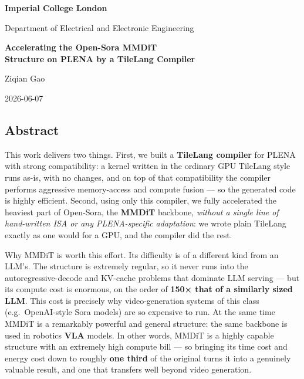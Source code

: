 \documentclass[
  10pt,
]{article}
\author{}
\date{}
\begin{document}
\begin{titlepage}
\centering
\vspace*{2cm}

{\LARGE\bfseries Imperial College London\par}
\vspace{0.5cm}
{\large Department of Electrical and Electronic Engineering\par}

\vspace{3cm}

{\Huge\bfseries Accelerating the Open-Sora MMDiT\\[4mm]
Structure on PLENA by a TileLang Compiler\par}

\vspace{2.5cm}

{\Large Ziqian Gao\par}

\vfill

{\large 2026-06-07\par}
\vspace{1cm}
\end{titlepage}

{
\setcounter{tocdepth}{3}
\tableofcontents
}

\subsection*{Abstract}\label{abstract}

This work delivers two things. First, we built a \textbf{TileLang
compiler} for PLENA with strong compatibility: a kernel written in the
ordinary GPU TileLang style runs as-is, with no changes, and on top of
that compatibility the compiler performs aggressive memory-access and
compute fusion --- so the generated code is highly efficient. Second,
using only this compiler, we fully accelerated the heaviest part of
Open-Sora, the \textbf{MMDiT} backbone, \emph{without a single line of
hand-written ISA or any PLENA-specific adaptation}: we wrote plain
TileLang exactly as one would for a GPU, and the compiler did the rest.

Why MMDiT is worth this effort. Its difficulty is of a different kind
from an LLM's. The structure is extremely regular, so it never runs into
the autoregressive-decode and KV-cache problems that dominate LLM
serving --- but its compute cost is enormous, on the order of
\textbf{150× that of a similarly sized LLM}. This cost is precisely why
video-generation systems of this class (e.g.\ OpenAI-style Sora models)
are so expensive to run. At the same time MMDiT is a remarkably powerful
and general structure: the same backbone is used in robotics
\textbf{VLA} models. In other words, MMDiT is a highly capable structure
with an extremely high compute bill --- so bringing its time cost and
energy cost down to roughly \textbf{one third} of the original turns it
into a genuinely valuable result, and one that transfers well beyond
video generation.
\end{document}
